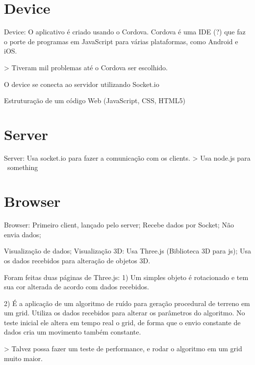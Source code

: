\documentclass[a4paper,12pt]{article}
\begin{document}
\section{Device}


Device:
  O aplicativo é criado usando o Cordova.
    Cordova é uma IDE (?) que faz o porte de programas em JavaScript para várias plataformas, como Android e iOS.


    > Tiveram mil problemas até o Cordova ser escolhido.


  O device se conecta ao servidor utilizando Socket.io




Estruturação de um código Web (JavaScript, CSS, HTML5)







\section{Server}

Server:
  Usa socket.io para fazer a comunicação com os clients.
  > Usa node.js para ~something~









\section{Browser}

Browser:
  Primeiro client, lançado pelo server;
  Recebe dados por Socket;
  Não envia dados;


  Visualização de dados;
    Visualização 3D:
      Usa Three.js (Biblioteca 3D para js);
      Usa os dados recebidos para alteração de objetos 3D.


      Foram feitas duas páginas de Three.js:
        1) Um simples objeto é rotacionado e tem sua cor alterada de acordo com dados recebidos.


        2) É a aplicação de um algoritmo de ruído para geração procedural de terreno em um grid. Utiliza os dados recebidos para alterar os parâmetros do algoritmo.
          No teste inicial ele altera em tempo real o grid, de forma que o envio constante de dados cria um movimento também constante.


          > Talvez possa fazer um teste de performance, e rodar o algoritmo em um grid muito maior.
\end{document}

